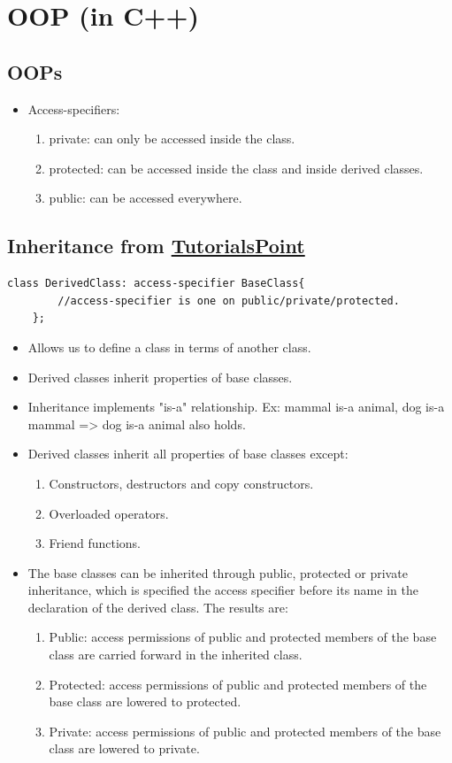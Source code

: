 \documentclass{report}
\begin{document}
\chapter{OOP (in C++)}
\section{OOPs}
\begin{itemize}
    \item Access-specifiers:
    \begin{enumerate}
        \item private: can only be accessed inside the class.
        \item protected: can be accessed inside the class and inside derived classes.
        \item public: can be accessed everywhere.
    \end{enumerate}
\end{itemize}
\section{Inheritance from \href{https://www.tutorialspoint.com/cplusplus/cpp_inheritance.htm}{TutorialsPoint}}
\begin{lstlisting}[caption=Syntax]
    class DerivedClass: access-specifier BaseClass{
        //access-specifier is one on public/private/protected.
    };
\end{lstlisting}
\begin{itemize}
    \item Allows us to define a class in terms of another class.
    \item Derived classes inherit properties of base classes.
    \item Inheritance implements "is-a" relationship. Ex: mammal is-a animal, dog is-a mammal => dog is-a animal also holds.
    \item Derived classes inherit all properties of base classes except:
    \begin{enumerate}
        \item Constructors, destructors and copy constructors.
        \item Overloaded operators.
        \item Friend functions.
    \end{enumerate}
    \item The base classes can be inherited through public, 
    protected or private inheritance, which is specified the 
    access specifier before its name in the declaration of the 
    derived class. The results are:
    \begin{enumerate}
        \item Public: access permissions of public and protected members of the base class are carried forward in the inherited class.
        \item Protected: access permissions of public and protected members of the base class are lowered to protected.
        \item Private: access permissions of public and protected members of the base class are lowered to private.
    \end{enumerate}
\end{itemize}
\end{document}
